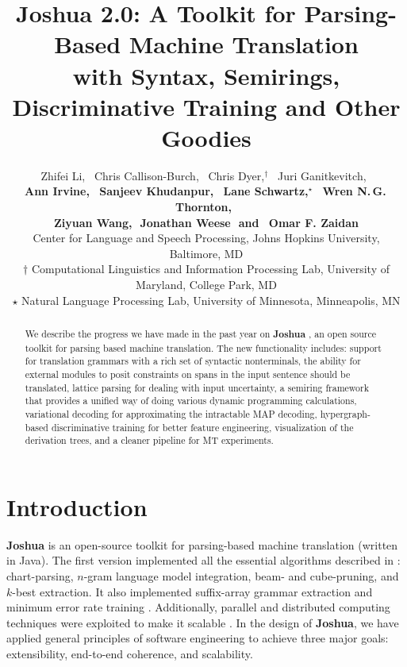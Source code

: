 \documentclass[11pt]{article}
\title{Joshua 2.0: A Toolkit for Parsing-Based Machine Translation \\with Syntax, Semirings, Discriminative Training and Other Goodies }
\author{
Zhifei Li,\,\,\,
Chris Callison-Burch,\,\,\,
Chris Dyer,$^\dagger$\,\,\,
Juri Ganitkevitch,\,\,\,
\\ {\bf
Ann Irvine,\,\,\,  
Sanjeev Khudanpur,\,\,\,
Lane Schwartz,$^\star$\,\,\, 
Wren N.\,G.\,Thornton,\,\,\,}
\\ {\bf
Ziyuan Wang,\,\,
Jonathan Weese\,\,
{\textnormal{and}}
\,\,\,Omar F. Zaidan
}\\
Center for Language and Speech Processing, Johns Hopkins University, Baltimore, MD\\
$\dagger$ Computational Linguistics and Information Processing Lab, University of Maryland, College Park, MD\\
$\star$ Natural Language Processing Lab, University of Minnesota, Minneapolis, MN }
\date{}
\newcommand{\joshua}{\textbf{Joshua}\xspace}
\begin{document}
\maketitle
\begin{abstract}
We describe the progress we have made in the past year on \textbf{Joshua} \cite{joshua-wmt09}, 
an open source toolkit for parsing based machine translation.
The new functionality includes: 
support for translation grammars with a rich set of syntactic nonterminals,
the ability for external modules to posit constraints on spans in the input sentence should be translated,  
lattice parsing for dealing with input uncertainty,
a semiring framework that provides a unified way of doing various dynamic programming calculations, 
variational decoding for approximating the intractable MAP decoding,
hypergraph-based discriminative training for better feature engineering, 
visualization of the derivation trees, 
and a cleaner pipeline for MT experiments.
\end{abstract}



\section{Introduction}

\textbf{Joshua} \cite{joshua-wmt09} is an open-source toolkit for parsing-based machine translation (written in Java). 
The first version implemented all the essential algorithms described 
in : chart-parsing, $n$-gram language model integration, beam- and cube-pruning, and $k$-best extraction.  
It also implemented suffix-array grammar extraction \cite{lopez:2007:EMNLP-CoNLL2007} 
and minimum error rate training \cite{och-mert}. 
Additionally, parallel and distributed computing techniques were exploited 
to make it scalable \cite{Joshua-old}. In the design of \joshua, we have applied general
principles of software engineering to achieve three
major goals: extensibility, end-to-end coherence,
and scalability.
\end{document}
